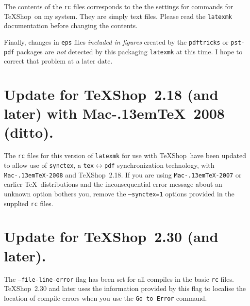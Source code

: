 \documentclass[11pt]{article}
\newcommand{\MacTeX}{Mac\kern-.13em\TeX}
\newcommand{\TS}{\textsf{\TeX Shop}}
\begin{document}
The contents of the \texttt{rc} files corresponds to the the settings for commands for \TS\ on my system. They are simply text files. Please read the \texttt{latexmk} documentation before changing the contents.


Finally, changes in \texttt{eps} files \emph{included in figures} created by the \texttt{pdftricks} or \texttt{pst-pdf} packages are \emph{not} detected by this packaging \texttt{latexmk} at this time. I hope to correct that problem at a later date.

\section{Update for \TS\ 2.18 (and later) with \MacTeX\ 2008 (ditto).}

The \texttt{rc} files for this version of \texttt{latexmk} for use with \TS\ have been updated to allow use of \texttt{synctex}, a \texttt{tex\(\leftrightarrow\)pdf} synchronization technology, with \texttt{\MacTeX-2008} and \TS\ 2.18. If you are using \texttt{\MacTeX-2007} or earlier \TeX\ distributions and the inconsequential error message about an unknown option bothers you, remove the \texttt{--synctex=1} options provided in the supplied \texttt{rc} files.

\section{Update for \TS\ 2.30 (and later).}

The \texttt{--file-line-error} flag has been set for all compiles in the basic \texttt{rc} files. \TS\ 2.30 and later uses the information provided by this flag to localise the location of compile errors when you use the \texttt{Go to Error} command.
\end{document}

